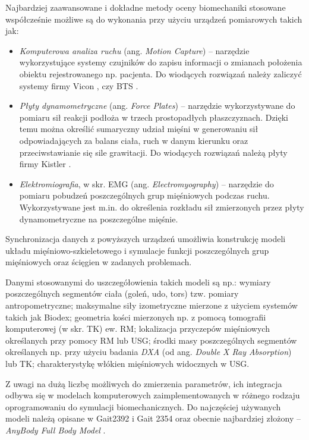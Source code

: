 Najbardziej zaawansowane i dokładne metody oceny biomechaniki stosowane współcześnie możliwe są do wykonania przy użyciu urządzeń pomiarowych takich jak:
\begin{itemize}
	\item \textit{Komputerowa analiza ruchu} (ang. \textit{Motion Capture}) -- narzędzie wykorzystujące systemy czujników do zapisu informacji o zmianach położenia obiektu rejestrowanego np. pacjenta. Do wiodących rozwiązań należy zaliczyć systemy firmy Vicon \cite{Vicon}, czy BTS \cite{BTS}.
	\item \textit{Płyty dynamometryczne} (ang. \textit{Force Plates}) -- narzędzie wykorzystywane do pomiaru sił reakcji podłoża w trzech prostopadłych płaszczyznach. Dzięki temu można określić sumaryczny udział mięśni w generowaniu sił odpowiadających za balans ciała, ruch w danym kierunku oraz przeciwstawianie się sile grawitacji. Do wiodących rozwiązań należą płyty firmy Kistler \cite{KISTLER}.
	\item \textit{Elektromiografia}, w skr. EMG (ang. \textit{Electromyography}) -- narzędzie do pomiaru pobudzeń poszczególnych grup mięśniowych podczas ruchu. Wykorzystywane jest m.in. do określenia rozkładu sił zmierzonych przez płyty dynamometryczne na poszczególne mięśnie.
\end{itemize}

Synchronizacja danych z powyższych urządzeń umożliwia konstrukcję modeli układu mięśniowo-szkieletowego i symulacje funkcji poszczególnych grup mięśniowych oraz ścięgien w zadanych problemach.

Danymi stosowanymi do uszczegółowienia takich modeli są np.: wymiary poszczególnych segmentów ciała (goleń, udo, tors) tzw. pomiary antropometryczne; maksymalne siły izometryczne mierzone z użyciem systemów takich jak Biodex; geometria kości mierzonych np. z pomocą tomografii komputerowej (w skr. TK) ew. RM; lokalizacja przyczepów mięśniowych określanych przy pomocy RM lub USG; środki masy poszczególnych segmentów określanych np. przy użyciu badania \textit{DXA} (od ang. \textit{Double X Ray Absorption}) lub TK; charakterystykę włókien mięśniowych widocznych w USG.

Z uwagi na dużą liczbę możliwych do zmierzenia parametrów, ich integracja odbywa się w modelach komputerowych zaimplementowanych w różnego rodzaju oprogramowaniu do symulacji biomechanicznych. Do najczęściej używanych modeli należą opisane w \cite{John2013} Gait2392 i Gait 2354 oraz obecnie najbardziej złożony -- \textit{AnyBody Full Body Model} \cite{Bassani2017}. 

